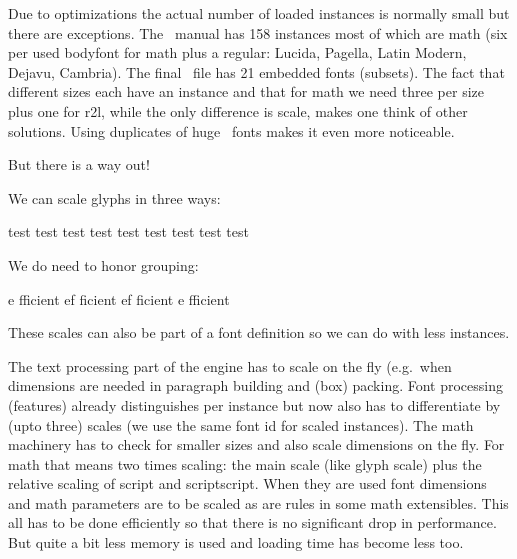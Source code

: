 \stoptitle

\starttitle[title={Practice}]

\startitemize
    \startitem
        Due to optimizations the actual number of loaded instances is normally
        small but there are exceptions.
    \stopitem
    \startitem
        The \LUAMETATEX\ manual has 158 instances most of which are math (six per
        used bodyfont for math plus a regular: Lucida, Pagella, Latin Modern,
        Dejavu, Cambria).
    \stopitem
    \startitem
        The final \PDF\ file has 21 embedded fonts (subsets).
    \stopitem
    \startitem
        The fact that different sizes each have an instance and that for math
        we need three per size plus one for r2l, while the only difference
        is scale, makes one think of other solutions.
    \stopitem
    \startitem
        Using duplicates of huge \CJK\ fonts makes it even more noticeable.
    \stopitem
\stopitemize

But there is a way out!

\stoptitle

\starttitle[title=Glyph scaling]

We can scale glyphs in three ways:

\startbuffer
{}%
test { test} test
test { test} test
test { test} test
\stopbuffer

\typebuffer {\getbuffer}

We do need to honor grouping:

\startbuffer
{}%
e{ ff}icient
ef{ f}icient
ef{ fi}cient
e{ ffi}cient
\stopbuffer

\typebuffer {\getbuffer}

These scales can also be part of a font definition so we can do with less
instances.

\stoptitle

\starttitle[title=Implications]

\startitemize
    \startitem
        The text processing part of the engine has to scale on the fly (e.g.\
        when dimensions are needed in paragraph building and (box) packing.
    \stopitem
    \startitem
        Font processing (features) already distinguishes per instance but now also
        has to differentiate by (upto three) scales (we use the same font id
        for scaled instances).
    \stopitem
    \startitem
        The math machinery has to check for smaller sizes and also scale
        dimensions on the fly.
    \stopitem
    \startitem
        For math that means two times scaling: the main scale (like glyph scale) plus
        the relative scaling of script and scriptscript.
    \stopitem
    \startitem
        When they are used font dimensions and math parameters are to be scaled as are
        rules in some math extensibles.
    \stopitem
    \startitem
        This all has to be done efficiently so that there is no significant drop in
        performance.
    \stopitem
    \startitem
        But quite a bit less memory is used and loading time has become less too.
    \stopitem
\stopitemize

